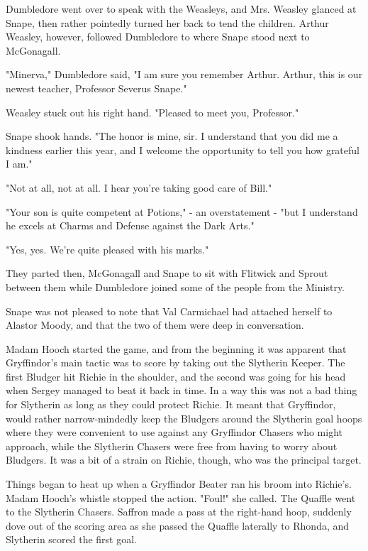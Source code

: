 \documentclass[a4paper,11pt]{article}
\begin{document}
Dumbledore went over to speak with the Weasleys, and Mrs. Weasley glanced at Snape, then rather pointedly turned her back to tend the children. Arthur Weasley, however, followed Dumbledore to where Snape stood next to McGonagall.

"Minerva," Dumbledore said, "I am sure you remember Arthur. Arthur, this is our newest teacher, Professor Severus Snape."

Weasley stuck out his right hand. "Pleased to meet you, Professor."

Snape shook hands. "The honor is mine, sir. I understand that you did me a kindness earlier this year, and I welcome the opportunity to tell you how grateful I am."

"Not at all, not at all. I hear you're taking good care of Bill."

"Your son is quite competent at Potions," - an overstatement - "but I understand he excels at Charms and Defense against the Dark Arts."

"Yes, yes. We're quite pleased with his marks."

They parted then, McGonagall and Snape to sit with Flitwick and Sprout between them while Dumbledore joined some of the people from the Ministry.

Snape was not pleased to note that Val Carmichael had attached herself to Alastor Moody, and that the two of them were deep in conversation.

Madam Hooch started the game, and from the beginning it was apparent that Gryffindor's main tactic was to score by taking out the Slytherin Keeper. The first Bludger hit Richie in the shoulder, and the second was going for his head when Sergey managed to beat it back in time. In a way this was not a bad thing for Slytherin as long as they could protect Richie. It meant that Gryffindor, would rather narrow-mindedly keep the Bludgers around the Slytherin goal hoops where they were convenient to use against any Gryffindor Chasers who might approach, while the Slytherin Chasers were free from having to worry about Bludgers. It was a bit of a strain on Richie, though, who was the principal target.

Things began to heat up when a Gryffindor Beater ran his broom into Richie's. Madam Hooch's whistle stopped the action. "Foul!" she called. The Quaffle went to the Slytherin Chasers. Saffron made a pass at the right-hand hoop, suddenly dove out of the scoring area as she passed the Quaffle laterally to Rhonda, and Slytherin scored the first goal.
\end{document}
